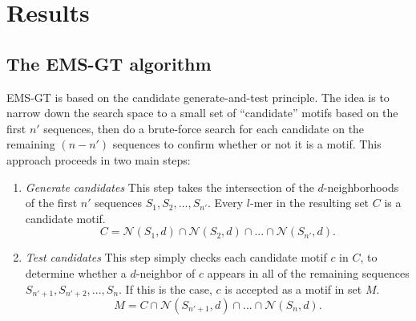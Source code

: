 \documentclass{acm_proc_article-sp}
\begin{document}
\section{Results}
	\subsection{The EMS-GT algorithm}
		EMS-GT is based on the candidate generate-and-test principle. The idea is to narrow down the search space to a small set of ``candidate'' motifs based on the first $n'$ sequences, then do a brute-force search for each candidate on the remaining $(n - n')$ sequences to confirm whether or not it is a motif. This approach proceeds in two main steps:
		\begin{enumerate} %
			\item {\em Generate candidates}\newline
			This step takes the intersection of the $d$-neighborhoods of the first $n'$ sequences $S_{1},S_{2},...,S_{n'}$. Every $l$-mer in the resulting set $C$ is a candidate motif.\newline
			\begin{equation}
			C = \mathcal{N}(S_{1}, d) \cap \mathcal{N}(S_{2}, d) \cap...\cap \mathcal{N}(S_{n'}, d).
			\end{equation} %
			\item {\em Test candidates}\newline
			This step simply checks each candidate motif $c$ in $C$, to determine whether a $d$-neighbor of $c$ appears in all of the remaining sequences $S_{n'+1},S_{n'+2},...,S_{n}$. If this is the case, $c$ is accepted as a motif in set $M$.\newline
			\begin{equation}
			M = C \cap \mathcal{N}(S_{n'+1}, d) \cap...\cap \mathcal{N}(S_{n}, d).
			\end{equation} %
			\end{enumerate}
		\newpage
\end{document}
